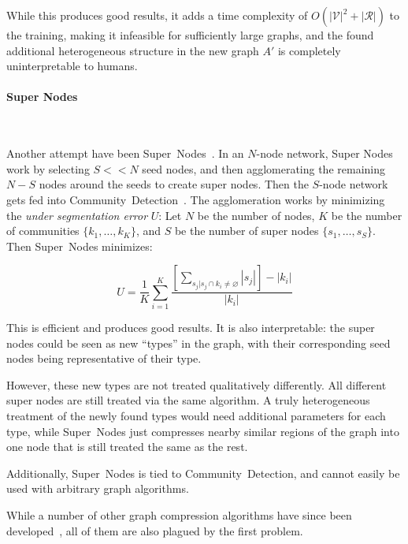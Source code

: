 While this produces good results, it adds a time complexity of $O(|\mathcal{V}|^2 + |\mathcal{R}|)$ to the training, making it infeasible for sufficiently large graphs, and the found additional heterogeneous structure in the new graph $A'$ is completely uninterpretable to humans.

\paragraph{Super Nodes}$\,$

Another attempt have been Super~Nodes~\cite{stanley_compressing_2018}. 
In an $N$-node network, Super Nodes work by selecting $S << N$ seed nodes,
and then agglomerating the remaining $N-S$ nodes around the seeds to create super nodes.
Then the $S$-node network gets fed into Community~Detection~\cite{fortunato_community_2010}.
The agglomeration works by minimizing the \emph{under segmentation error} $U$:
Let $N$ be the number of nodes, $K$ be the number of communities $\{k_1 , \dots , k_K\}$, and $S$ be the number of
super nodes $\{s_1 , \dots , s_S \}$. Then Super~Nodes minimizes:

\[ U = \frac{1}{K} \sum_{i=1}^{K} \frac{ [ \sum_{s_j | s_j \cap k_i \not= \varnothing } |s_j | ] - |k_i |}{|k_i|} \]

This is efficient and produces good results. It is also interpretable: the super nodes could be seen as new ``types'' in the graph, with their corresponding seed nodes being representative of their type.

However, these new types are not treated qualitatively differently.
All different super nodes are still treated via the same algorithm.
A truly heterogeneous treatment of the newly found types would need additional parameters for each type, while Super~Nodes just compresses nearby similar regions of the graph into one node that is still treated the same as the rest.

Additionally, Super~Nodes is tied to Community~Detection, and cannot easily be used with arbitrary graph algorithms.

While a number of other graph compression algorithms have since been developed~\cite{besta_survey_2019}, all of them are also plagued by the first problem.
% 
% 
% 
% 


